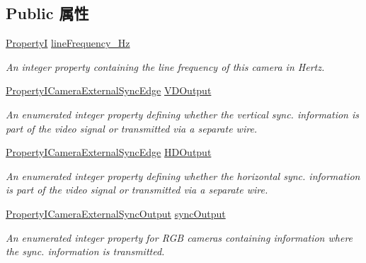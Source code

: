 \subsection*{Public 属性}
\begin{DoxyCompactItemize}
\item 
\hypertarget{classmv_i_m_p_a_c_t_1_1acquire_1_1_camera_description_non_standard_a0ecfe452c35344325938c08df52a3563}{\hyperlink{group___common_interface_ga12d5e434238ca242a1ba4c6c3ea45780}{Property\+I} \hyperlink{classmv_i_m_p_a_c_t_1_1acquire_1_1_camera_description_non_standard_a0ecfe452c35344325938c08df52a3563}{line\+Frequency\+\_\+\+Hz}}\label{classmv_i_m_p_a_c_t_1_1acquire_1_1_camera_description_non_standard_a0ecfe452c35344325938c08df52a3563}

\begin{DoxyCompactList}\small\item\em An integer property containing the line frequency of this camera in Hertz. \end{DoxyCompactList}\item 
\hyperlink{group___device_specific_interface_gaac63793b596b074fc5012dd82aafd035}{Property\+I\+Camera\+External\+Sync\+Edge} \hyperlink{classmv_i_m_p_a_c_t_1_1acquire_1_1_camera_description_non_standard_a688577153fdb465ea25854df6eb57995}{V\+D\+Output}
\begin{DoxyCompactList}\small\item\em An enumerated integer property defining whether the vertical sync. information is part of the video signal or transmitted via a separate wire. \end{DoxyCompactList}\item 
\hyperlink{group___device_specific_interface_gaac63793b596b074fc5012dd82aafd035}{Property\+I\+Camera\+External\+Sync\+Edge} \hyperlink{classmv_i_m_p_a_c_t_1_1acquire_1_1_camera_description_non_standard_ac1ded162cacf263999ae46d8b00bd0ec}{H\+D\+Output}
\begin{DoxyCompactList}\small\item\em An enumerated integer property defining whether the horizontal sync. information is part of the video signal or transmitted via a separate wire. \end{DoxyCompactList}\item 
\hyperlink{group___device_specific_interface_gaf4592fe544c7f9ad2d0b480f7f1b75b5}{Property\+I\+Camera\+External\+Sync\+Output} \hyperlink{classmv_i_m_p_a_c_t_1_1acquire_1_1_camera_description_non_standard_a72881ca42a2397676d6f5f7249170ecb}{sync\+Output}
\begin{DoxyCompactList}\small\item\em An enumerated integer property for R\+G\+B cameras containing information where the sync. information is transmitted. \end{DoxyCompactList}\item 

\end{DoxyCompactItemize}
